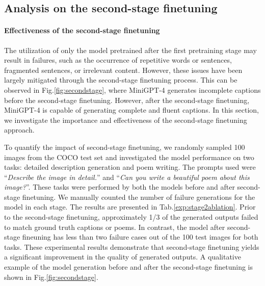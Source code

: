 \subsection{Analysis on the second-stage finetuning}

\paragraph{Effectiveness of the second-stage finetuning}

The utilization of only the model pretrained after the first pretraining stage may result in failures, such as the occurrence of repetitive words or sentences, fragmented sentences, or irrelevant content. However, these issues have been largely mitigated through the second-stage finetuning process. This can be observed in Fig.\ref{fig:secondstage}, where MiniGPT-4 generates incomplete captions before the second-stage finetuning. However, after the second-stage finetuning, MiniGPT-4 is capable of generating complete and fluent captions. In this section, we investigate the importance and effectiveness of the second-stage finetuning approach.

To quantify the impact of second-stage finetuning, we randomly sampled 100 images from the COCO test set and investigated the model performance on two tasks: detailed description generation and poem writing. The prompts used were ``\textit{Describe the image in detail.}'' and ``\textit{Can you write a beautiful poem about this image?}''. These tasks were performed by both the models before and after second-stage finetuning. We manually counted the number of failure generations for the model in each stage. The results are presented in Tab.\ref{exp:stage2ablation}. Prior to the second-stage finetuning, approximately 1/3 of the generated outputs failed to match ground truth captions or poems. In contrast, the model after second-stage fineuning has less than two failure cases out of the 100 test images for both tasks. These experimental results demonstrate that second-stage finetuning yields a significant improvement in the quality of generated outputs. A qualitative example of the model generation before and after the second-stage finetuning is shown in Fig.\ref{fig:secondstage}.




